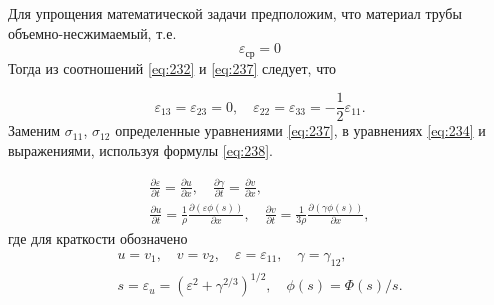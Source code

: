 \documentclass[specialist, subf, href, colorlinks=true, 14pt, final]{disser}
\theoremstyle{definition}
\begin{document}
Для упрощения математической задачи предположим, что материал трубы объемно-несжимаемый, т.е.
\[ \varepsilon_{\text{ср}} = 0 \]
Тогда из соотношений \eqref{eq:232} и \eqref{eq:237} следует, что
\addtocounter{equation}{1}
\begin{equation}\label{eq:238}
	 \varepsilon_{13} = \varepsilon_{23} = 0, \quad \varepsilon_{22} = \varepsilon_{33} = - \frac{1}{2}\varepsilon_{11}. 
	\tag{8}
\end{equation} 
Заменим $\sigma_{11}$, $\sigma_{12}$ определенные уравнениями \eqref{eq:237}, в уравнениях \eqref{eq:234} и выражениями, используя формулы \eqref{eq:238}.
\addtocounter{equation}{1}
	\begin{equation}\label{eq:239}
		\begin{array}{l}
			\displaystyle \frac{\partial \varepsilon}{\partial t} = \displaystyle \frac{\partial u}{\partial x}, \quad \displaystyle \frac{\partial \gamma}{\partial t} = \displaystyle \frac{\partial v}{\partial x}, \\
			\displaystyle \frac{\partial u}{\partial t} = \displaystyle \frac{1}{\rho} \frac{\partial (\varepsilon \phi(s))}{\partial x}, \quad \displaystyle \frac{\partial v}{\partial t} = \displaystyle \frac{1}{3 \rho} \frac{\partial (\gamma \phi(s))}{\partial x},
		\end{array}
  	\tag{9}
	\end{equation}
где для краткости обозначено 
\[ 
	\begin{array}{l}
		u = v_1, \quad v = v_2, \quad \varepsilon = \varepsilon_{11}, \quad \gamma = \gamma_{12}, \\
		s = \varepsilon_u = (\varepsilon^2 + \gamma^{2/3})^{1/2}, \quad \phi(s) = \Phi(s)/s.
	\end{array}
\]
\end{document}
